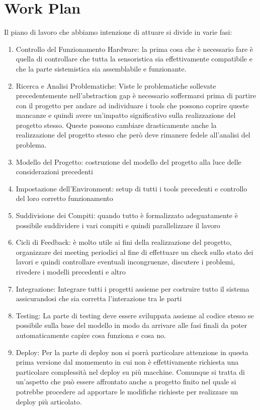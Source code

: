 \section{Work Plan}

Il piano di lavoro che abbiamo intenzione di attuare si divide in varie fasi:

\begin{enumerate}
  \item{Controllo del Funzionamento Hardware:} la prima cosa che \`e necessario fare \`e quella di controllare che tutta la sensoristica sia effettivamente compatibile e che la parte sistemistica sia assemblabile e funzionante.
  \item{Ricerca e Analisi Problematiche:} Viste le problematiche sollevate precedentemente nell'abstraction gap \`e necessario soffermarsi prima di partire con il progetto per andare ad individuare i tools che possono coprire queste mancanze e quindi avere un'impatto significativo sulla realizzazione del progetto stesso. Queste possono cambiare drasticamente anche la realizzazione del progetto stesso che per\`o deve rimanere fedele all'analisi del problema.
  \item{Modello del Progetto:} costruzione del modello del progetto alla luce delle considerazioni precedenti
  \item{Impostazione dell'Environment:} setup di tutti i tools precedenti e controllo del loro corretto funzionamento
  \item{Suddivisione dei Compiti:} quando tutto \`e formalizzato adeguatamente \`e possibile suddividere i vari compiti e quindi parallelizzare il lavoro
  \item{Cicli di Feedback:} \`e molto utile ai fini della realizzazione del progetto, organizzare dei meeting periodici al fine di effettuare un check sullo stato dei lavori e quindi controllare eventuali incongruenze, discutere i problemi, rivedere i modelli precedenti e altro
  \item{Integrazione:} Integrare tutti i progetti assieme per costruire tutto il sistema assicurandosi che sia corretta l'interazione tra le parti
  \item{Testing:} La parte di testing deve essere sviluppata assieme al codice stesso se possibile sulla base del modello in modo da arrivare alle fasi finali da poter automaticamente capire cosa funziona e cosa no.
  \item{Deploy:} Per la parte di deploy non si porr\`a particolare attenzione in questa prima versione dal momemento in cui non \`e effettivamente richiesta una particolare complessit\`a nel deploy su pi\`u macchine. Comunque si tratta di un'aspetto che pu\`o essere affrontato anche a progetto finito nel quale si potrebbe procedere ad apportare le modifiche richieste per realizzare un deploy pi\`u articolato.
\end{enumerate}

